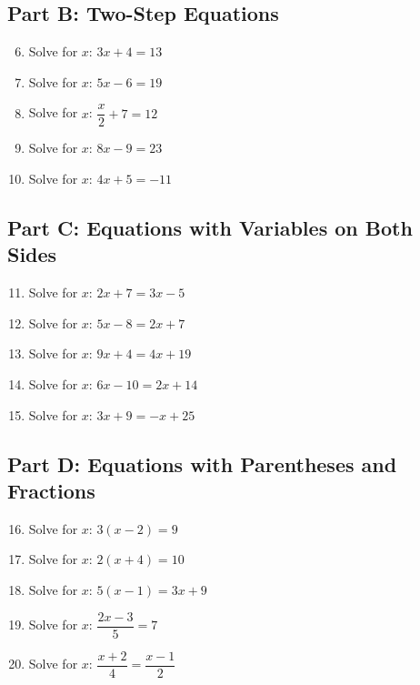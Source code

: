 \documentclass[14pt]{extarticle}
\begin{document}
\subsection*{Part B: Two-Step Equations}
\begin{enumerate}
    \setcounter{enumi}{5}
    \item Solve for \(x\): \(3x + 4 = 13\)
    \item Solve for \(x\): \(5x - 6 = 19\)
    \item Solve for \(x\): \(\dfrac{x}{2} + 7 = 12\)
    \item Solve for \(x\): \(8x - 9 = 23\)
    \item Solve for \(x\): \(4x + 5 = -11\)
\end{enumerate}

\subsection*{Part C: Equations with Variables on Both Sides}
\begin{enumerate}
    \setcounter{enumi}{10}
    \item Solve for \(x\): \(2x + 7 = 3x - 5\)
    \item Solve for \(x\): \(5x - 8 = 2x + 7\)
    \item Solve for \(x\): \(9x + 4 = 4x + 19\)
    \item Solve for \(x\): \(6x - 10 = 2x + 14\)
    \item Solve for \(x\): \(3x + 9 = -x + 25\)
\end{enumerate}

\subsection*{Part D: Equations with Parentheses and Fractions}
\begin{enumerate}
    \setcounter{enumi}{15}
    \item Solve for \(x\): \(3(x - 2) = 9\)
    \item Solve for \(x\): \(2(x + 4) = 10\)
    \item Solve for \(x\): \(5(x - 1) = 3x + 9\)
    \item Solve for \(x\): \(\dfrac{2x - 3}{5} = 7\)
    \item Solve for \(x\): \(\dfrac{x + 2}{4} = \dfrac{x - 1}{2}\)
\end{enumerate}
\end{document}
